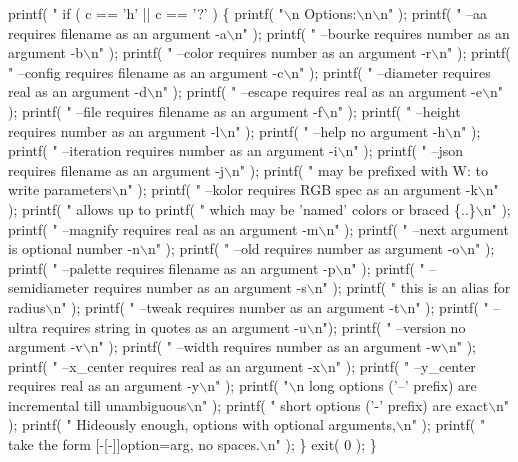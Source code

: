 \begin{DoxyCode}
    printf( "%
    if ( c == 'h' || c == '?' ) \{
        printf( "\(\backslash\)n  Options:\(\backslash\)n\(\backslash\)n" );
        printf( "  --aa           requires filename as an argument -a\(\backslash\)n" );
        printf( "  --bourke       requires number as an argument -b\(\backslash\)n" );
        printf( "  --color        requires number as an argument -r\(\backslash\)n" );
        printf( "  --config       requires filename as an argument -c\(\backslash\)n" );
        printf( "  --diameter     requires real as an argument   -d\(\backslash\)n" );
        printf( "  --escape       requires real as an argument   -e\(\backslash\)n" );
        printf( "  --file         requires filename as an argument -f\(\backslash\)n" );
        printf( "  --height       requires number as an argument -l\(\backslash\)n" );
        printf( "  --help         no argument                    -h\(\backslash\)n" );
        printf( "  --iteration    requires number as an argument -i\(\backslash\)n" );
        printf( "  --json         requires filename as an argument -j\(\backslash\)n" );
        printf( "      may be prefixed with W: to write parameters\(\backslash\)n" );
        printf( "  --kolor        requires RGB spec as an argument -k\(\backslash\)n" );
        printf( "      allows up to %
        printf( "      which may be 'named' colors or braced \{..\}\(\backslash\)n" );
        printf( "  --magnify      requires real as an argument   -m\(\backslash\)n" );
        printf( "  --next         argument is optional number    -n\(\backslash\)n" );
        printf( "  --old          requires number as argument    -o\(\backslash\)n" );
        printf( "  --palette      requires filename as an argument -p\(\backslash\)n" );
        printf( "  --semidiameter requires number as an argument -s\(\backslash\)n" );
        printf( "      this is an alias for radius\(\backslash\)n" );
        printf( "  --tweak        requires number as an argument -t\(\backslash\)n" );
        printf( "  --ultra        requires string in quotes as an argument -u\(\backslash\)n");
        printf( "  --version      no argument                    -v\(\backslash\)n" );
        printf( "  --width        requires number as an argument -w\(\backslash\)n" );
        printf( "  --x\_center     requires real as an argument   -x\(\backslash\)n" );
        printf( "  --y\_center     requires real as an argument   -y\(\backslash\)n" );
        printf( "\(\backslash\)n  long options ('--' prefix) are incremental till unambiguous\(\backslash\)n" );
        printf( "  short options ('-' prefix) are exact\(\backslash\)n" );
        printf( "  Hideously enough, options with optional arguments,\(\backslash\)n" );
        printf( "  take the form [-[-]]option=arg, no spaces.\(\backslash\)n" );
    \}
    exit( 0 );
\}
\end{DoxyCode}


